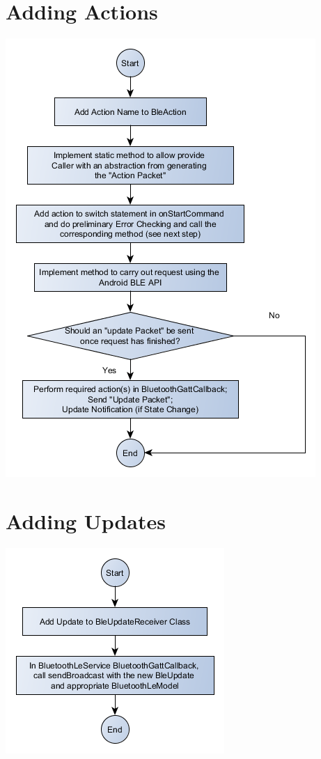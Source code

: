 \documentclass{scrreprt}
\begin{document}
\section{Adding Actions}
\includegraphics[width=\textwidth]{AddActionFlowchart}

\section{Adding Updates}
\includegraphics[width=\textwidth]{AddUpdateFlowchart}
\end{document}

